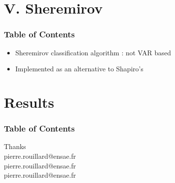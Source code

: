 \documentclass[9pt, xcolor={dvipsnames}]{beamer}
\begin{document}
\section{V. Sheremirov}
\begin{frame}
  \frametitle{Table of Contents}
  \tableofcontents[currentsection]
\end{frame}
\begin{frame}
  \begin{itemize}
    \item Sheremirov classification algorithm : not VAR based
    \item Implemented as an alternative to Shapiro's
  \end{itemize}
\end{frame}

\section{Results}
\begin{frame}
  \frametitle{Table of Contents}
  \tableofcontents[currentsection]
\end{frame}

\begin{frame}
 \begin{center}
		{\Huge Thanks}\\
		\bigskip\bigskip %
		{\LARGE pierre.rouillard@ensae.fr}\\
		{\LARGE pierre.rouillard@ensae.fr}\\
		{\LARGE pierre.rouillard@ensae.fr}\\
	\end{center}
\end{frame}
\end{document}
